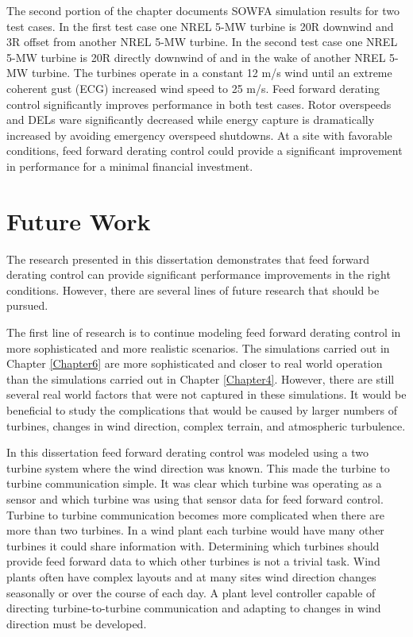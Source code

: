 The second portion of the chapter documents SOWFA simulation results for two test cases. In the first test case one NREL 5-MW turbine is 20R downwind and 3R offset from another NREL 5-MW turbine. In the second test case one NREL 5-MW turbine is 20R directly downwind of and in the wake of another NREL 5-MW turbine. The turbines operate in a constant 12 m/s wind until an extreme coherent gust (ECG) increased wind speed to 25 m/s. Feed forward derating control significantly improves performance in both test cases. Rotor overspeeds and DELs ware significantly decreased while energy capture is dramatically increased by avoiding emergency overspeed shutdowns.  At a site with favorable conditions, feed forward derating control could provide a significant improvement in performance for a minimal financial investment.



\section{Future Work}

The research presented in this dissertation demonstrates that feed forward derating control can provide significant performance improvements in the right conditions. However, there are several lines of future research that should be pursued. 

The first line of research is to continue modeling feed forward derating control in more sophisticated and more realistic scenarios. The simulations carried out in Chapter \ref{Chapter6} are more sophisticated and closer to real world operation than the simulations carried out in Chapter \ref{Chapter4}. However, there are still several real world factors that were not captured in these simulations. It would be beneficial  to study the complications that would be caused by larger numbers of turbines, changes in wind direction, complex terrain, and atmospheric turbulence.

In this dissertation feed forward derating control was modeled using a two turbine system where the wind direction was known. This made the turbine to turbine communication simple. It was clear which turbine was operating as a sensor and which turbine was using that sensor data for feed forward control. Turbine to turbine communication becomes more complicated when there are more than two turbines. In a wind plant each turbine would have many other turbines it could share information with. Determining which turbines should provide feed forward data to which other turbines is not a trivial task. Wind plants often have complex layouts and at many sites wind direction changes seasonally or over the course of each day. A plant level controller capable of directing turbine-to-turbine communication and adapting to changes in wind direction must be developed. 

